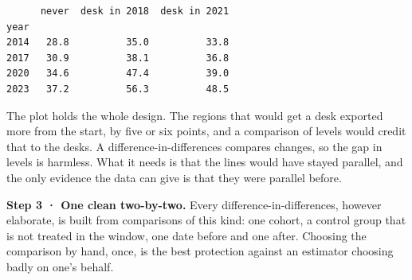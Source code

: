 \documentclass[
  letterpaper,
  10pt,
  twoside,
  openright,
  numbers=noenddot,
  chapterprefix=true]{scrbook}
\begin{document}
\begin{verbatim}
      never  desk in 2018  desk in 2021
year                                   
2014   28.8          35.0          33.8
2017   30.9          38.1          36.8
2020   34.6          47.4          39.0
2023   37.2          56.3          48.5
\end{verbatim}

The plot holds the whole design. The regions that would get a desk
exported more from the start, by five or six points, and a comparison of
levels would credit that to the desks. A difference-in-differences
compares changes, so the gap in levels is harmless. What it needs is
that the lines would have stayed parallel, and the only evidence the
data can give is that they were parallel before.

\textbf{Step 3 · One clean two-by-two.} Every difference-in-differences,
however elaborate, is built from comparisons of this kind: one cohort, a
control group that is not treated in the window, one date before and one
after. Choosing the comparison by hand, once, is the best protection
against an estimator choosing badly on one's behalf.
\end{document}
